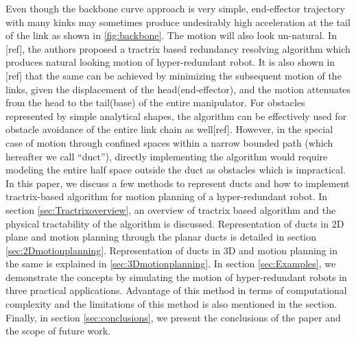 \documentclass[12pt,a4]{article}
\begin{document}
Even though the backbone curve approach is very simple, end-effector trajectory with many kinks may sometimes produce undesirably high acceleration at the tail of the link as shown in \cref{fig:backbone}. The motion will also look un-natural. In [ref], the authors proposed a tractrix based redundancy resolving algorithm which produces natural looking motion of hyper-redundant robot. It is also shown in [ref] that the same can be achieved by minimizing the subsequent motion of the links, given the displacement of the head(end-effector), and the motion attenuates from the head to the tail(base) of the entire manipulator. For obstacles represented by simple analytical shapes, the algorithm can be effectively used for obstacle avoidance of the entire link chain as well[ref]. However, in the special case of motion through confined spaces within a narrow bounded path (which hereafter we call ``duct''), directly implementing the algorithm would require modeling the entire half space outside the duct as obstacles which is impractical. In this paper, we discuss a few methods to represent ducts and how to implement tractrix-based algorithm for motion planning of a hyper-redundant robot. In section \ref{sec:Tractrixoverview}, an overview of tractrix based algorithm and the physical tractability of the algorithm is discussed. Representation of ducts in 2D plane and motion planning through the planar ducts is detailed in section \ref{sec:2Dmotionplanning}. Representation of ducts in 3D and motion planning in the same is explained in \cref{sec:3Dmotionplanning}. In section \ref{sec:Examples}, we demonstrate the concepts by simulating the motion of hyper-redundant robots in three practical applications. Advantage of this method in terms of computational complexity and the limitations of this method is also mentioned in the section. Finally, in section \ref{sec:conclusions}, we present the conclusions of the paper and the scope of future work.
\end{document}
